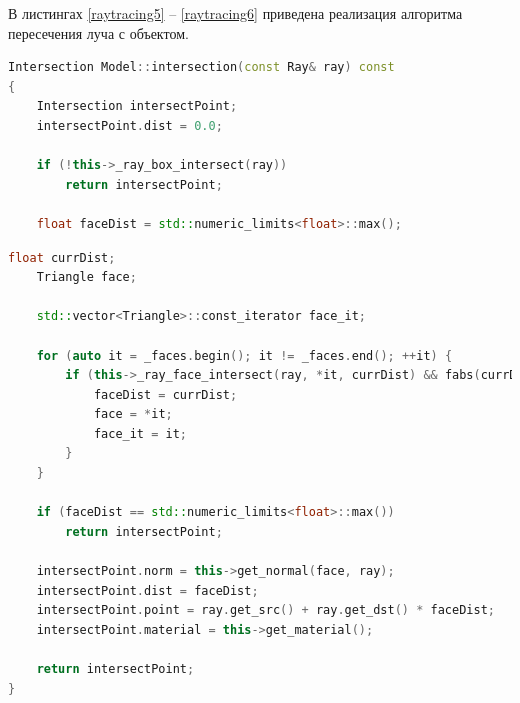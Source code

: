 В листингах \ref{raytracing5} -- \ref{raytracing6}   приведена реализация алгоритма пересечения луча с объектом.

\begin{lstlisting}[label=raytracing5,caption=Реализация алгоритма пересечения луча с объектом (начало), language=C++]
Intersection Model::intersection(const Ray& ray) const
{
	Intersection intersectPoint;
	intersectPoint.dist = 0.0;
	
	if (!this->_ray_box_intersect(ray))
		return intersectPoint;
	
	float faceDist = std::numeric_limits<float>::max();
\end{lstlisting}
\begin{lstlisting}[label=raytracing6,caption=Реализация алгоритма пересечения луча с объектом (конец), language=C++]
	float currDist;
	Triangle face;
	
	std::vector<Triangle>::const_iterator face_it;
	
	for (auto it = _faces.begin(); it != _faces.end(); ++it) {
		if (this->_ray_face_intersect(ray, *it, currDist) && fabs(currDist) < faceDist) {
			faceDist = currDist;
			face = *it;
			face_it = it;
		}
	}
	
	if (faceDist == std::numeric_limits<float>::max())
		return intersectPoint;
	
	intersectPoint.norm = this->get_normal(face, ray);
	intersectPoint.dist = faceDist;
	intersectPoint.point = ray.get_src() + ray.get_dst() * faceDist;
	intersectPoint.material = this->get_material();
	
	return intersectPoint;
}
\end{lstlisting}

